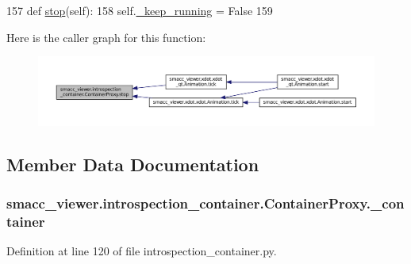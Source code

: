 \begin{DoxyCode}
157     \textcolor{keyword}{def }\hyperlink{classsmacc__viewer_1_1introspection__container_1_1ContainerProxy_a9e504e0b390bf0a6a1ecaca410bbc996}{stop}(self):
158         self.\hyperlink{classsmacc__viewer_1_1introspection__container_1_1ContainerProxy_ae4526126fccd31f57df2e44b04de8517}{\_keep\_running} = \textcolor{keyword}{False}
159 
\end{DoxyCode}


Here is the caller graph for this function\+:
\nopagebreak
\begin{figure}[H]
\begin{center}
\leavevmode
\includegraphics[width=350pt]{classsmacc__viewer_1_1introspection__container_1_1ContainerProxy_a9e504e0b390bf0a6a1ecaca410bbc996_icgraph}
\end{center}
\end{figure}




\subsection{Member Data Documentation}
\subsubsection[{\texorpdfstring{\+\_\+container}{_container}}]{\setlength{\rightskip}{0pt plus 5cm}smacc\+\_\+viewer.\+introspection\+\_\+container.\+Container\+Proxy.\+\_\+container\hspace{0.3cm}{\ttfamily [private]}}\hypertarget{classsmacc__viewer_1_1introspection__container_1_1ContainerProxy_a3148d29e291a87befdab3faa03ed6c62}{}\label{classsmacc__viewer_1_1introspection__container_1_1ContainerProxy_a3148d29e291a87befdab3faa03ed6c62}


Definition at line 120 of file introspection\+\_\+container.\+py.


